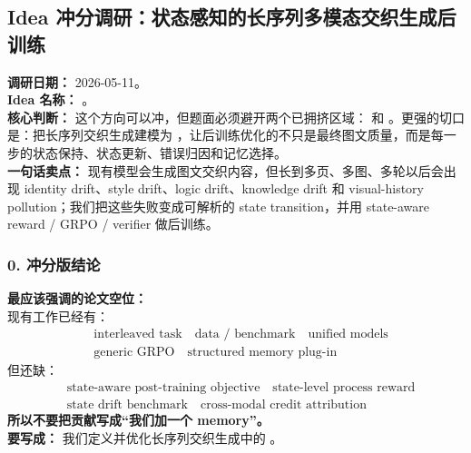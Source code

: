 \subsection*{Idea 冲分调研：状态感知的长序列多模态交织生成后训练}
{}

\begin{conceptbox}
\textbf{调研日期：} 2026-05-11。\\
\textbf{Idea 名称：} 。\\
\textbf{核心判断：} 这个方向可以冲，但题面必须避开两个已拥挤区域： 和 。更强的切口是：把长序列交织生成建模为 ，让后训练优化的不只是最终图文质量，而是每一步的状态保持、状态更新、错误归因和记忆选择。\\
\textbf{一句话卖点：} 现有模型会生成图文交织内容，但长到多页、多图、多轮以后会出现 identity drift、style drift、logic drift、knowledge drift 和 visual-history pollution；我们把这些失败变成可解析的 state transition，并用 state-aware reward / GRPO / verifier 做后训练。
\end{conceptbox}

\subsubsection*{0. 冲分版结论}

\begin{summarybox}
\textbf{最应该强调的论文空位：}\\
现有工作已经有：
\[
\begin{aligned}
&\text{interleaved task}
\quad
\text{data / benchmark}
\quad
\text{unified models}\\
&\text{generic GRPO}
\quad
\text{structured memory plug-in}
\end{aligned}
\]
但还缺：
\[
\begin{aligned}
&\text{state-aware post-training objective}
\quad
\text{state-level process reward}\\
&\text{state drift benchmark}
\quad
\text{cross-modal credit attribution}
\end{aligned}
\]
\textbf{所以不要把贡献写成“我们加一个 memory”。}\\
\textbf{要写成：} 我们定义并优化长序列交织生成中的 。
\end{summarybox}

